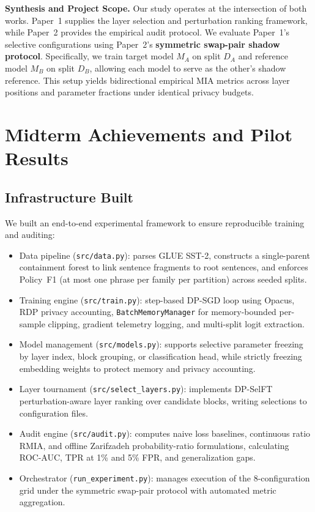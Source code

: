 \documentclass[11pt,a4paper]{article}
\begin{document}
\textbf{Synthesis and Project Scope.}
Our study operates at the intersection of both works. Paper~1 supplies the layer selection
and perturbation ranking framework, while Paper~2 provides the empirical audit protocol. We
evaluate Paper~1's selective configurations using Paper~2's \textbf{symmetric swap-pair
shadow protocol}. Specifically, we train target model $M_A$ on split $D_A$ and reference model
$M_B$ on split $D_B$, allowing each model to serve as the other's shadow reference. This setup
yields bidirectional empirical MIA metrics across layer positions and parameter fractions under
identical privacy budgets.

\section{Midterm Achievements and Pilot Results}

\subsection{Infrastructure Built}

We built an end-to-end experimental framework to ensure reproducible training and auditing:
\begin{itemize}
  \item Data pipeline (\texttt{src/data.py}): parses GLUE SST-2, constructs a single-parent
        containment forest to link sentence fragments to root sentences, and enforces Policy~F1
        (at most one phrase per family per partition) across seeded splits.
  \item Training engine (\texttt{src/train.py}): step-based DP-SGD loop using Opacus, RDP
        privacy accounting, \texttt{BatchMemoryManager} for memory-bounded per-sample clipping,
        gradient telemetry logging, and multi-split logit extraction.
  \item Model management (\texttt{src/models.py}): supports selective parameter freezing by
        layer index, block grouping, or classification head, while strictly freezing embedding
        weights to protect memory and privacy accounting.
  \item Layer tournament (\texttt{src/select\_layers.py}): implements DP-SelFT perturbation-aware
        layer ranking over candidate blocks, writing selections to configuration files.
  \item Audit engine (\texttt{src/audit.py}): computes naive loss baselines, continuous ratio
        RMIA, and offline Zarifzadeh probability-ratio formulations, calculating ROC-AUC,
        TPR at 1\% and 5\% FPR, and generalization gaps.
  \item Orchestrator (\texttt{run\_experiment.py}): manages execution of the 8-configuration
        grid under the symmetric swap-pair protocol with automated metric aggregation.
\end{itemize}
\end{document}
